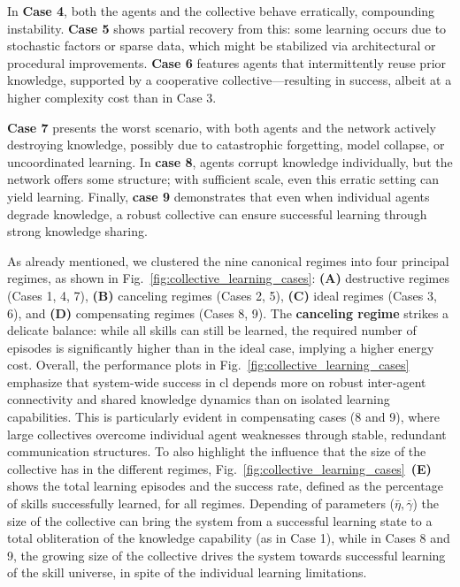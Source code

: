 \documentclass[12pt]{article}
\begin{document}
In \textbf{Case 4}, both the agents and the collective behave erratically, compounding instability. \textbf{Case 5} shows partial recovery from this: some learning occurs due to stochastic factors or sparse data, which might be stabilized via architectural or procedural improvements. \textbf{Case 6} features agents that intermittently reuse prior knowledge, supported by a cooperative collective—resulting in success, albeit at a higher complexity cost than in Case 3.

\textbf{Case 7} presents the worst scenario, with both agents and the network actively destroying knowledge, possibly due to catastrophic forgetting, model collapse, or uncoordinated learning. In \textbf{case 8}, agents corrupt knowledge individually, but the network offers some structure; with sufficient scale, even this erratic setting can yield learning. Finally, \textbf{case 9} demonstrates that even when individual agents degrade knowledge, a robust collective can ensure successful learning through strong knowledge sharing.

As already mentioned, we clustered the nine canonical regimes into four principal regimes, as shown in Fig.~\ref{fig:collective_learning_cases}: \textbf{(A)} destructive regimes (Cases 1, 4, 7), \textbf{(B)} canceling regimes (Cases 2, 5), \textbf{(C)} ideal regimes (Cases 3, 6), and \textbf{(D)} compensating regimes (Cases 8, 9). The \textbf{canceling regime} strikes a delicate balance: while all skills can still be learned, the required number of episodes is significantly higher than in the ideal case, implying a higher energy cost. Overall, the performance plots in Fig.~\ref{fig:collective_learning_cases} emphasize that system-wide success in \acl{cl} depends more on robust inter-agent connectivity and shared knowledge dynamics than on isolated learning capabilities. This is particularly evident in compensating cases (8 and 9), where large collectives overcome individual agent weaknesses through stable, redundant communication structures. To also highlight the influence that the size of the collective has in the different regimes, Fig.~\ref{fig:collective_learning_cases}~\textbf{(E)} shows the total learning episodes and the success rate, defined as the percentage of skills successfully learned, for all regimes. Depending of parameters ($\bar{\eta},\bar{\gamma}$) the size of the collective can bring the system from a successful learning state to a total obliteration of the knowledge capability (as in Case 1), while in Cases 8 and 9, the growing size of the collective drives the system towards successful learning of the skill universe, in spite of the individual learning limitations.
\end{document}
